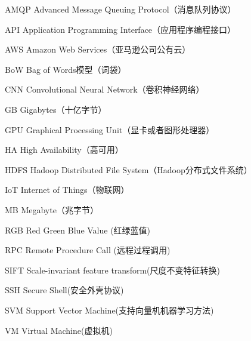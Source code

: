 \begin{denotation}[3cm]
\item[AMQP] Advanced Message Queuing Protocol（消息队列协议）
\item[API] Application Programming Interface（应用程序编程接口）
\item[AWS] Amazon Web Services（亚马逊公司公有云）
\item[BoW] Bag of Words模型（词袋）
\item[CNN] Convolutional Neural Network（卷积神经网络）
\item[GB]  Gigabytes（十亿字节）
\item[GPU] Graphical Processing Unit（显卡或者图形处理器）
\item[HA] High Availability（高可用）
\item[HDFS] Hadoop Distributed File System（Hadoop分布式文件系统）
\item[IoT] Internet of Things（物联网）
\item[MB] Megabyte（兆字节）
\item[RGB] Red Green Blue Value (红绿蓝值)
\item[RPC] Remote Procedure Call (远程过程调用)
\item[SIFT] Scale-invariant feature transform(尺度不变特征转换)
\item[SSH] Secure Shell(安全外壳协议)
\item[SVM] Support Vector Machine(支持向量机机器学习方法)
\item[VM] Virtual Machine(虚拟机)
\end{denotation}
